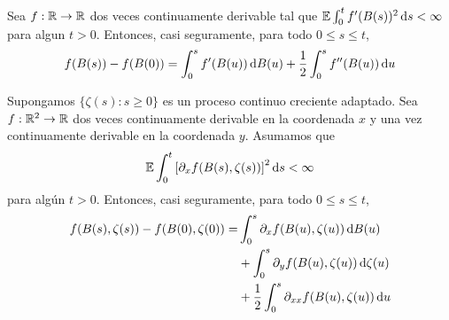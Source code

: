 \begin{theorem}
  Sea \(f : \mathbb{R} \rightarrow \mathbb{R}\) dos veces continuamente derivable tal que \(\operatorname{\mathbb{E}} \int_0^t f'(B(s))^2 \mathop{}\!\mathrm{d} s < \infty\) para algun \(t > 0\).
  Entonces, casi seguramente, para todo \(0 \leq s \leq t\),
  \begin{align}
    f(B(s)) - f(B(0))
    =
    \int_0^s f'(B(u)) \mathop{}\!\mathrm{d} B(u)
    + \frac{1}{2} \int_0^s f''(B(u)) \mathop{}\!\mathrm{d} u
  \end{align}
\end{theorem}
\begin{theorem}
  Supongamos \(\{\zeta(s) : s \geq 0\}\) es un proceso continuo creciente adaptado.
  Sea \(f : \mathbb{R}^2 \rightarrow \mathbb{R}\) dos veces continuamente derivable en la coordenada \(x\) y una vez continuamente derivable en la coordenada \(y\).
  Asumamos que
  \begin{align}
    \operatorname{\mathbb{E}} \int_0^t \left[ \partial_x f(B(s), \zeta(s)) \right]^2 \mathop{}\!\mathrm{d} s
    <
    \infty
  \end{align}
  para algún \(t > 0\).
  Entonces, casi seguramente, para todo \(0 \leq s \leq t\),
  \begin{align}
    f(B(s), \zeta(s)) - f(B(0), \zeta(0))
    =
    &\int_0^s \partial_x f (B(u), \zeta(u)) \mathop{}\!\mathrm{d} B(u)
    \\
    &+ \int_0^s \partial_y f(B(u), \zeta(u)) \mathop{}\!\mathrm{d} \zeta(u)
    \\
    &+ \frac{1}{2} \int_0^s \partial_{x x} f(B(u), \zeta(u)) \mathop{}\!\mathrm{d} u
  \end{align}
\end{theorem}

